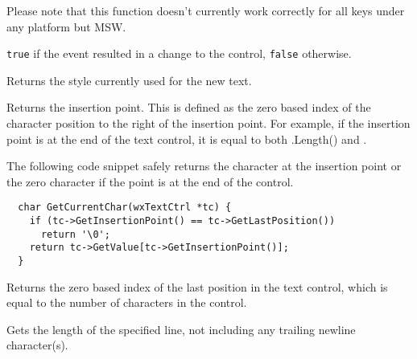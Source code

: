 Please note that this function doesn't currently work correctly for all keys
under any platform but MSW.


{\tt true} if the event resulted in a change to the control, {\tt false}
otherwise.


\label{wxtextctrlgetdefaultstyle}


Returns the style currently used for the new text.




\label{wxtextctrlgetinsertionpoint}


Returns the insertion point. This is defined as the zero based index of the
character position to the right of the insertion point. For example, if
the insertion point is at the end of the text control, it is equal to
both .Length() and
.

The following code snippet safely returns the character at the insertion
point or the zero character if the point is at the end of the control.

{\small%
\begin{verbatim}
  char GetCurrentChar(wxTextCtrl *tc) {
    if (tc->GetInsertionPoint() == tc->GetLastPosition())
      return '\0';
    return tc->GetValue[tc->GetInsertionPoint()];
  }
\end{verbatim}
}%


\label{wxtextctrlgetlastposition}


Returns the zero based index of the last position in the text control,
which is equal to the number of characters in the control.


\label{wxtextctrlgetlinelength}


Gets the length of the specified line, not including any trailing newline
character(s).

